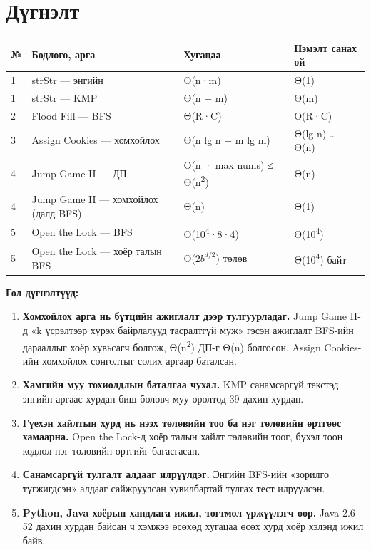 \documentclass[11pt,a4paper]{article}
\renewcommand{\_}{\oldunderscore\allowbreak}
\begin{document}
\section{Дүгнэлт}

\begin{center}
\small
\begin{tabularx}{\linewidth}{l>{\raggedright\arraybackslash}Xll}
\toprule
\textbf{№} & \textbf{Бодлого, арга} & \textbf{Хугацаа} & \textbf{Нэмэлт санах ой} \\
\midrule
1 & strStr — энгийн & O(n·m) & Θ(1) \\
1 & strStr — KMP & Θ(n + m) & Θ(m) \\
2 & Flood Fill — BFS & Θ(R·C) & O(R·C) \\
3 & Assign Cookies — хомхойлох & Θ(n lg n + m lg m) & Θ(lg n) … Θ(n) \\
4 & Jump Game II — ДП & O(n · max nums) ≤ Θ(n\textsuperscript{2}) & Θ(n) \\
4 & Jump Game II — хомхойлох (далд BFS) & Θ(n) & Θ(1) \\
5 & Open the Lock — BFS & O(10\textsuperscript{4}·8·4) & Θ(10\textsuperscript{4}) \\
5 & Open the Lock — хоёр талын BFS & O($2b^{d/2}$) төлөв & Θ(10\textsuperscript{4}) байт \\
\bottomrule
\end{tabularx}
\end{center}

\textbf{Гол дүгнэлтүүд:}
\begin{enumerate}
\item \textbf{Хомхойлох арга нь бүтцийн ажиглалт дээр тулгуурладаг.} Jump Game II-д «k үсрэлтээр хүрэх байрлалууд тасралтгүй муж» гэсэн ажиглалт BFS-ийн дарааллыг хоёр хувьсагч болгож, Θ(n\textsuperscript{2}) ДП-г Θ(n) болгосон. Assign Cookies-ийн хомхойлох сонголтыг солих аргаар баталсан.
\item \textbf{Хамгийн муу тохиолдлын баталгаа чухал.} KMP санамсаргүй текстэд энгийн аргаас хурдан биш боловч муу оролтод 39 дахин хурдан.
\item \textbf{Гүехэн хайлтын хурд нь нээх төлөвийн тоо ба нэг төлөвийн өртгөөс хамаарна.} Open the Lock-д хоёр талын хайлт төлөвийн тоог, бүхэл тоон кодлол нэг төлөвийн өртгийг багасгасан.
\item \textbf{Санамсаргүй тулгалт алдааг илрүүлдэг.} Энгийн BFS-ийн «зорилго түгжигдсэн» алдааг сайжруулсан хувилбартай тулгах тест илрүүлсэн.
\item \textbf{Python, Java хоёрын хандлага ижил, тогтмол үржүүлэгч өөр.} Java 2.6–52 дахин хурдан байсан ч хэмжээ өсөхөд хугацаа өсөх хурд хоёр хэлэнд ижил байв.
\end{enumerate}
\end{document}
